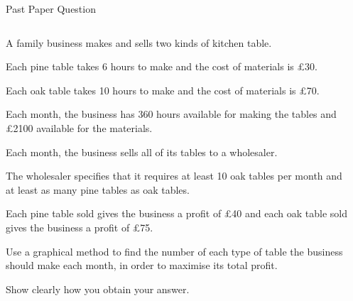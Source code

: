 \documentclass[8pt]{beamer}
\begin{document}
\begin{frame}[shrink=25]{Past Paper Question}
	\begin{columns}
	\begin{column}{.65\linewidth}
	\begin{problem}
		A family business makes and sells two kinds of kitchen table.

		Each pine table takes 6 hours to make and the cost of materials is £30.

		Each oak table takes 10 hours to make and the cost of materials is £70.

		Each month, the business has 360 hours available for making the tables and £2100 available for the materials.

		Each month, the business sells all of its tables to a wholesaler.

		The wholesaler specifies that it requires at least 10 oak tables per month and at least as many pine tables as oak tables.

		Each pine table sold gives the business a profit of £40 and each oak table sold gives the business a profit of £75.

		Use a graphical method to find the number of each type of table the business should make each month, in order to maximise its total profit.

		Show clearly how you obtain your answer.
	\end{problem}
	\end{column}
	\begin{column}{.35\linewidth}
	
	\end{column}
	\end{columns}


\end{frame}
\end{document}
